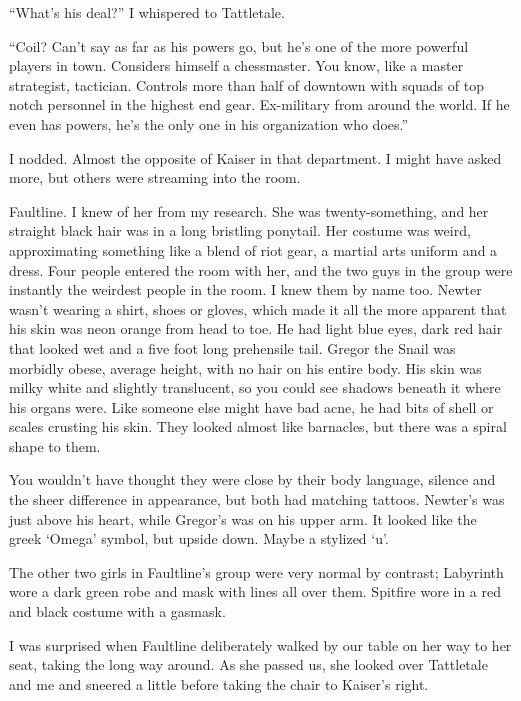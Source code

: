 ``What's his deal?'' I whispered to Tattletale.



``Coil?  Can't say as far as his powers go, but he's one of the more powerful players in town.  Considers himself a chessmaster.  You know, like a master strategist, tactician.   Controls more than half of downtown with squads of top notch personnel in the highest end gear.  Ex-military from around the world.  If he even has powers, he's the only one in his organization who does.''



I nodded.  Almost the opposite of Kaiser in that department.  I might have asked more, but others were streaming into the room.



Faultline.  I knew of her from my research.  She was twenty-something, and her straight black hair was in a long bristling ponytail.  Her costume was weird, approximating something like a blend of riot gear, a martial arts uniform and a dress.  Four people entered the room with her, and the two guys in the group were instantly the weirdest people in the room.  I knew them by name too.  Newter wasn't wearing a shirt, shoes or gloves, which made it all the more apparent that his skin was neon orange from head to toe.  He had light blue eyes, dark red hair that looked wet and a five foot long prehensile tail.  Gregor the Snail was morbidly obese, average height, with no hair on his entire body.  His skin was milky white and slightly translucent, so you could see shadows beneath it where his organs were.  Like someone else might have bad acne, he had bits of shell or scales crusting his skin.  They looked almost like barnacles, but there was a spiral shape to them.



You wouldn't have thought they were close by their body language, silence and the sheer difference in appearance, but both had matching tattoos.  Newter's was just above his heart, while Gregor's was on his upper arm.  It looked like the greek `Omega' symbol, but upside down.  Maybe a stylized `u'.



The other two girls in Faultline's group were very normal by contrast;  Labyrinth wore a dark green robe and mask with lines all over them.  Spitfire wore in a red and black costume with a gasmask.



I was surprised when Faultline deliberately walked by our table on her way to her seat, taking the long way around.  As she passed us, she looked over Tattletale and me and sneered a little before taking the chair to Kaiser's right.



